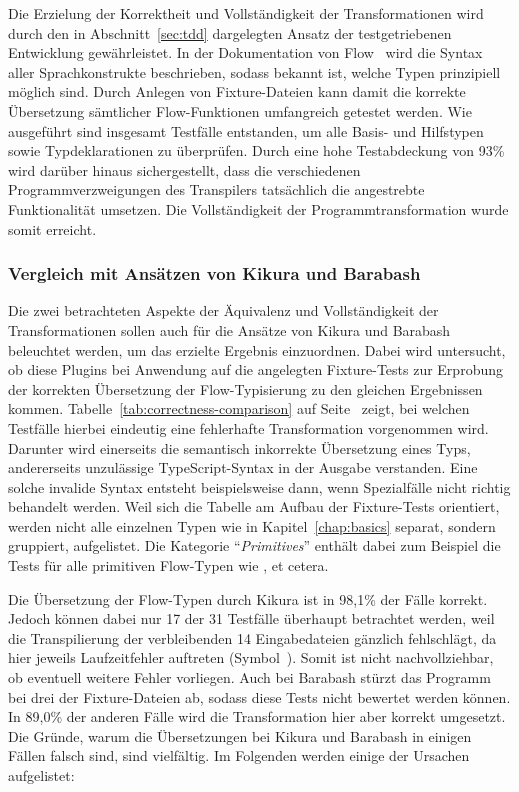 Die Erzielung der Korrektheit und Vollständigkeit der Transformationen wird durch den in Abschnitt~\ref{sec:tdd} dargelegten Ansatz der testgetriebenen Entwicklung gewährleistet. In der Dokumentation von Flow~\autocite{FLOW:TYPE_ANNOTATIONS} wird die Syntax aller Sprachkonstrukte beschrieben, sodass bekannt ist, welche Typen prinzipiell möglich sind. Durch Anlegen von Fixture-Dateien kann damit die korrekte Übersetzung sämtlicher Flow-Funktionen umfangreich getestet werden. Wie ausgeführt sind insgesamt \numberOfTests Testfälle entstanden, um alle Basis- und Hilfstypen sowie Typdeklarationen zu überprüfen. Durch eine hohe Testabdeckung von 93\% wird darüber hinaus sichergestellt, dass die verschiedenen Programmverzweigungen des Transpilers tatsächlich die angestrebte Funktionalität umsetzen. Die Vollständigkeit der Programmtransformation wurde somit erreicht.

\subsubsection{Vergleich mit Ansätzen von Kikura und Barabash}

Die zwei betrachteten Aspekte der Äquivalenz und Vollständigkeit der Transformationen sollen auch für die Ansätze von Kikura und Barabash beleuchtet werden, um das erzielte Ergebnis einzuordnen. Dabei wird untersucht, ob diese Plugins bei Anwendung auf die angelegten Fixture-Tests zur Erprobung der korrekten Übersetzung der Flow-Typisierung zu den gleichen Ergebnissen kommen.
Tabelle~\ref{tab:correctness-comparison} auf Seite~\pageref{tab:correctness-comparison} zeigt, bei welchen Testfälle hierbei eindeutig eine fehlerhafte Transformation vorgenommen wird. Darunter wird einerseits die semantisch inkorrekte Übersetzung eines Typs, andererseits unzulässige TypeScript-Syntax in der Ausgabe verstanden. Eine solche invalide Syntax entsteht beispielsweise dann, wenn Spezialfälle nicht richtig behandelt werden. Weil sich die Tabelle am Aufbau der Fixture-Tests orientiert, werden nicht alle einzelnen Typen wie in Kapitel~\ref{chap:basics} separat, sondern gruppiert, aufgelistet. Die Kategorie \enquote{\textit{Primitives}} enthält dabei zum Beispiel die Tests für alle primitiven Flow-Typen wie ,  et cetera.



Die Übersetzung der Flow-Typen durch Kikura ist in 98,1\% der Fälle korrekt. Jedoch können dabei nur 17 der 31 Testfälle überhaupt betrachtet werden, weil die Transpilierung der verbleibenden 14 Eingabedateien gänzlich fehlschlägt, da hier jeweils Laufzeitfehler auftreten (Symbol~\Lightning). Somit ist nicht nachvollziehbar, ob eventuell weitere Fehler vorliegen. Auch bei Barabash stürzt das Programm bei drei der Fixture-Dateien ab, sodass diese Tests nicht bewertet werden können. In 89,0\% der anderen Fälle wird die Transformation hier aber korrekt umgesetzt. Die Gründe, warum die Übersetzungen bei Kikura und Barabash in einigen Fällen falsch sind, sind vielfältig. Im Folgenden werden einige der Ursachen aufgelistet:

